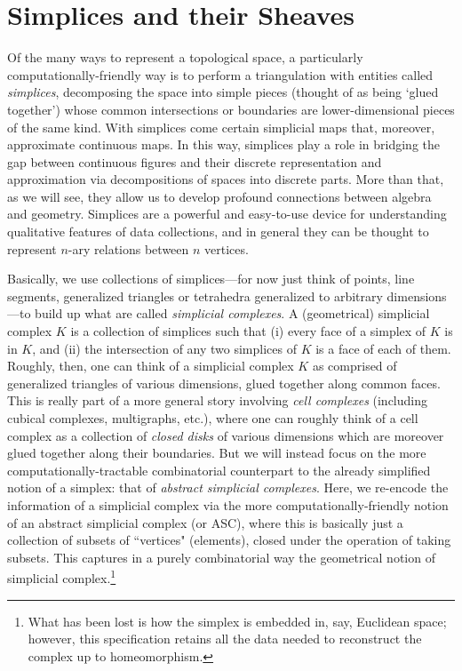 \documentclass[a4paper]{book}
\theoremstyle{definition}
\theoremstyle{definition}
\theoremstyle{definition}
\theoremstyle{theorem}
\theoremstyle{definition}
\begin{document}
\section{Simplices and their Sheaves}
Of the many ways to represent a topological space, a particularly computationally-friendly way is to perform a triangulation with entities called \textit{simplices}, decomposing the space into simple pieces (thought of as being `glued together') whose common intersections or boundaries are lower-dimensional pieces of the same kind. With simplices come certain simplicial maps that, moreover, approximate continuous maps. In this way, simplices play a role in bridging the gap between continuous figures and their discrete representation and approximation via decompositions of spaces into discrete parts. More than that, as we will see, they allow us to develop profound connections between algebra and geometry. Simplices are a powerful and easy-to-use device for understanding qualitative features of data collections, and in general they can be thought to represent $n$-ary relations between $n$ vertices. \par 
	Basically, we use collections of simplices---for now just think of points, line segments, generalized triangles or tetrahedra generalized to arbitrary dimensions---to build up what are called \textit{simplicial complexes}. A (geometrical) simplicial complex $K$ is a collection of simplices such that (i) every face of a simplex of $K$ is in $K$, and (ii) the intersection of any two simplices of $K$ is a face of each of them. Roughly, then, one can think of a simplicial complex $K$ as comprised of generalized triangles of various dimensions, glued together along common faces. This is really part of a more general story involving \textit{cell complexes} (including cubical complexes, multigraphs, etc.), where one can roughly think of a cell complex as a collection of \textit{closed disks} of various dimensions which are moreover glued together along their boundaries. But we will instead focus on the more computationally-tractable combinatorial counterpart to the already simplified notion of a simplex: that of \textit{abstract simplicial complexes}. Here, we re-encode the information of a simplicial complex via the more computationally-friendly notion of an abstract simplicial complex (or ASC), where this is basically just a collection of subsets of ``vertices" (elements), closed under the operation of taking subsets. This captures in a purely combinatorial way the geometrical notion of simplicial complex.\footnote{What has been lost is how the simplex is embedded in, say, Euclidean space; however, this specification retains all the data needed to reconstruct the complex up to homeomorphism.}   
\end{document}
